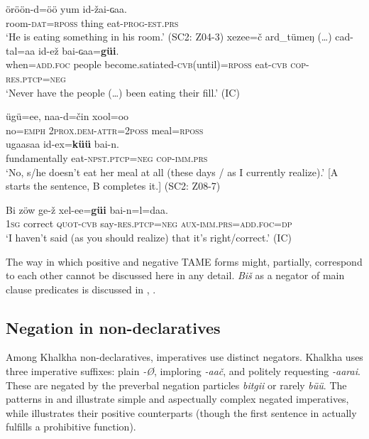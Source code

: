\documentclass[output=paper,colorlinks,citecolor=brown,chinesefont]{langscibook}
\begin{document}
\ea\label{ex:kha:9}
    \gll öröön-d=öö yum id-žai-ɢaa. \\ 
         room-\textsc{dat=rposs} thing eat-\textsc{prog-est.prs} \\
    \glt ‘He is eating something in his room.’ (SC2: Z04-3)
\z 
\ea\label{ex:kha:10}
    \gll xezee=č ard\_tümeŋ (…) cad-tal=aa id-ež bai-ɢaa=\textbf{güi}. \\ %
         when=\textsc{add.foc} people {} become.satiated-\textsc{cvb(}until)=\textsc{rposs} eat-\textsc{cvb} \textsc{cop-res.ptcp=neg} \\
    \glt ‘Never have the people (…) been eating their fill.’ (IC)
\z 
\ea\label{ex:kha:11}
    \begin{xlist}
    \label{ex:kha:11A}
        \gll ügü=ee, naa-d=čin   xool=oo \\ 
             no=\textsc{emph} \textsc{2prox.dem-attr=2poss} meal=\textsc{rposs} \\ %
        \glt 
    \label{ex:kha:11B}
        \gll ugaasaa id-ex=\textbf{küü} bai-n. \\ 
              fundamentally eat-\textsc{npst.ptcp=neg} \textsc{cop-imm.prs} \\
        \glt ‘No, s/he doesn’t eat her meal at all (these days / as I currently realize).’ [A starts the sentence, B completes it.] (SC2: Z08-7)
    \end{xlist}
\z 
\ea\label{ex:kha:12}
    \gll Bi zöw ge-ž xel-ee=\textbf{güi} bai-n=l=daa. \\ 
         \textsc{1sg} correct \textsc{quot-cvb}   say-\textsc{res.ptcp=neg} \textsc{aux-imm.prs=add.foc=dp} \\
    \glt ‘I haven’t said (as you should realize) that it’s right/correct.’ (IC)
\z 

The way in which positive and negative TAME forms might, partially, correspond to each other cannot be discussed here in any detail. \textit{Biš} as a negator of main clause predicates is discussed in , .


\subsection{Negation in non-declaratives} \label{sec:kha:2.2}

Among Khalkha non-declaratives, imperatives use distinct negators. Khalkha uses three imperative suffixes: plain \textit{-Ø}, imploring \textit{-aač}, and politely requesting \textit{-aarai}. These are negated by the preverbal negation particles \textit{bitgii} or rarely \textit{büü}. The patterns in  and  illustrate simple and aspectually complex negated imperatives, while  illustrates their positive counterparts (though the first sentence in  actually fulfills a prohibitive function).
\end{document}
